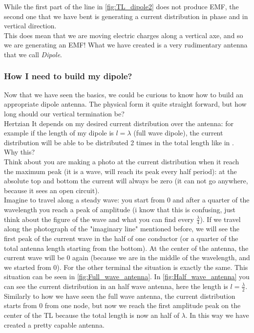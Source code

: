 While the first part of the line in \cref{fig:TL_dipole2} does not produce EMF, the second one that we have bent is generating a current distribution in phase and in vertical direction.\\
This does mean that we are moving electric charges along a vertical axe, and so we are generating an EMF! What we have created is a very rudimentary antenna that we call \emph{Dipole}.
\subsubsection*{How I need to build my dipole?}
Now that we have seen the basics, we could be curious to know how to build an appropriate dipole antenna. The physical form it quite straight forward, but how long should our vertical termination be?\\Hertzian 
It depends on my desired current distribution over the antenna: for example if the length of my dipole is $l=\lambda$ (full wave dipole), the current distribution will be able to be distributed 2 times in the total length like in . Why this?\\
Think about you are making a photo at the current distribution when it reach the maximum peak (it is a wave, will reach its peak every half period): at the absolute top and bottom the current will always be zero (it can not go anywhere, because it sees an open circuit).\\
Imagine to travel along a steady wave: you start from 0 and after a quarter of the wavelength you reach a peak of amplitude (i know that this is confusing, just think about the figure of the wave and what you can find every $\frac{\lambda}{4}$). If we travel along the photograph of the "imaginary line" mentioned before, we will see the first peak of the current wave in the half of one conductor (or a quarter of the total antenna length starting from the bottom). At the center of the antenna, the current wave will be 0 again (because we are in the middle of the wavelength, and we started from 0). For the other terminal the situation is exactly the same. This situation can be seen in \cref{fig:Full_wave_antenna}.
In \cref{fig:Half_wave_antenna} you can see the current distribution in an half wave antenna, here the length is $l=\frac{\lambda}{2}$.\\
Similarly to how we have seen the full wave antenna, the current distribution starts from 0 from one node, but now we reach the first amplitude peak on the center of the TL because the total length is now an half of $\lambda$. In this way we have created a pretty capable antenna.\\
